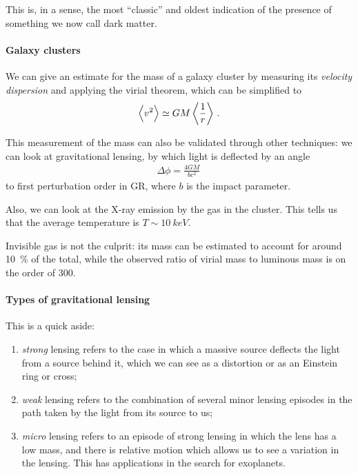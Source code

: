 \documentclass[main.tex]{subfiles}
\begin{document}
This is, in a sense, the most ``classic'' and oldest indication of the presence
of something we now call dark matter. 

\paragraph{Galaxy clusters}

We can give an estimate for the mass of a galaxy cluster by measuring its
\emph{velocity dispersion} and applying the virial theorem, which can be simplified to 
%
\begin{align}
\expval{v^2} \simeq GM \expval{ \frac{1}{r}}
\,.
\end{align}

This measurement of the mass can also be validated through other techniques: 
we can look at gravitational lensing, by which light is deflected by an angle 
%
\begin{align}
\Delta \phi = \frac{4GM}{bc^2}
\,
\end{align}
%
to first perturbation order in GR, where \(b\) is the impact parameter. 

Also, we can look at the X-ray emission by the gas in the cluster. 
This tells us that the average temperature is \(T \sim \SI{10}{keV}\). 


Invisible gas is not the culprit: its mass can be estimated to account for around 
\SI{10}{\percent} of the total, while the observed ratio of virial mass to luminous 
mass is on the order of 300.


\paragraph{Types of gravitational lensing}

This is a quick aside: 
\begin{enumerate}
    \item \emph{strong} lensing refers to the case in which a massive source 
    deflects the light from a source behind it, which we can see as a distortion or as an 
    Einstein ring or cross;
    \item \emph{weak} lensing refers to the combination of several minor lensing episodes
    in the path taken by the light from its source to us;
    \item \emph{micro} lensing refers to an episode of strong lensing in which the lens
    has a low mass, and there is relative motion which allows us to see a variation
    in the lensing. 
    This has applications in the search for exoplanets. 
\end{enumerate}
\end{document}
